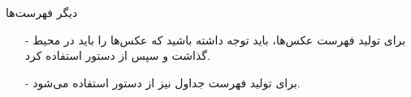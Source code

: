 \begin{frame}{دیگر فهرست‌ها}
\begin{itemize}\itemr
\item[-]
برای تولید فهرست عکس‌ها، باید توجه داشته باشید که عکس‌ها را باید در محیط 
گذاشت و سپس از دستور 
استفاده کرد.

\item[-]
برای تولید فهرست جداول نیز از دستور 
استفاده می‌شود.
\end{itemize}
\end{frame}
